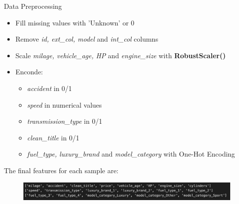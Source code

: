 \documentclass{beamer}
\begin{document}
\begin{frame}{Data Preprocessing}
    \begin{itemize}
        \item Fill missing values with 'Unknown' or 0
        \item Remove \textit{id, ext\_col, model} and \textit{int\_col} columns
        \item Scale \textit{milage, vehicle\_age, HP} and \textit{engine\_size} with \textbf{RobustScaler()}
        \item Enconde:
            \begin{itemize}
                \item \textit{accident} in 0/1
                \item \textit{speed} in numerical values
                \item \textit{transmission\_type} in 0/1
                \item \textit{clean\_title} in 0/1
                \item \textit{fuel\_type, luxury\_brand} and \textit{model\_category} with One-Hot Encoding
            \end{itemize}
    \end{itemize}
    The final features for each sample are:
    \begin{figure}
            \centering
            \includegraphics[width=1\linewidth]{images/POST-PROCESS_DATA_HEAD.png}
            \label{fig:enter-label}
    \end{figure}
\end{frame}

\end{document}
